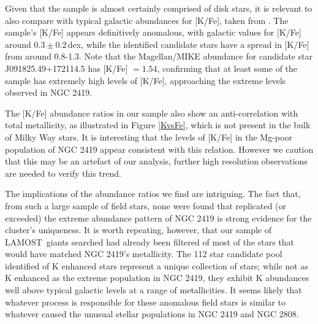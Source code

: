 \documentclass[a4paper,fleqn,usenatbib]{mnras}
\newcommand{\todo}[1]{\textcolor{red}{#1}}
\newcommand{\project}[1]{#1}
\newcommand{\lamost}{\project{LAMOST}}
\begin{document}
Given that the sample is almost certainly comprised of disk stars, it is relevant to also compare with typical galactic abundances for [K/Fe], taken from \cite{kobayashi2011}. The sample's [K/Fe] appears definitively anomalous, with galactic values for [K/Fe] around $0.3 \pm 0.2$\,dex, while the identified candidate stars have a spread in [K/Fe] from around 0.8-1.3. Note that the Magellan/MIKE abundance for candidate star J091825.49+172114.5 has [K/Fe] $=1.54$, confirming that at least some of the sample has extremely high levels of [K/Fe], approaching the extreme levels observed in NGC 2419.

The [K/Fe] abundance ratios in our sample also show an anti-correlation with total metallicity, as illustrated in Figure \ref{KvsFe}, which is not present in the bulk of Milky Way stars. It is interesting that the levels of [K/Fe] in the Mg-poor population of NGC 2419 appear consistent with this relation. However we caution that this may be an artefact of our analysis, further high resolution observations are needed to verify this trend.




The implications of the abundance ratios we find are intriguing. The fact that, from such a large sample of field stars, none were found that replicated (or exceeded) the extreme abundance pattern of NGC 2419 is strong evidence for the cluster's uniqueness.
It is worth repeating, however, that our sample of \lamost\ giants searched had already been filtered of most of the stars that would have matched NGC 2419's metallicity. The 112 star candidate pool identified of K enhanced stars represent a unique collection of stars; while not as K enhanced as the extreme population in NGC 2419, they exhibit K abundances well above typical galactic levels at a range of metallicities. It seems likely that whatever process is responsible for these anomalous field stars is similar to whatever caused the unusual stellar populations in NGC 2419 and NGC 2808.
\end{document}
